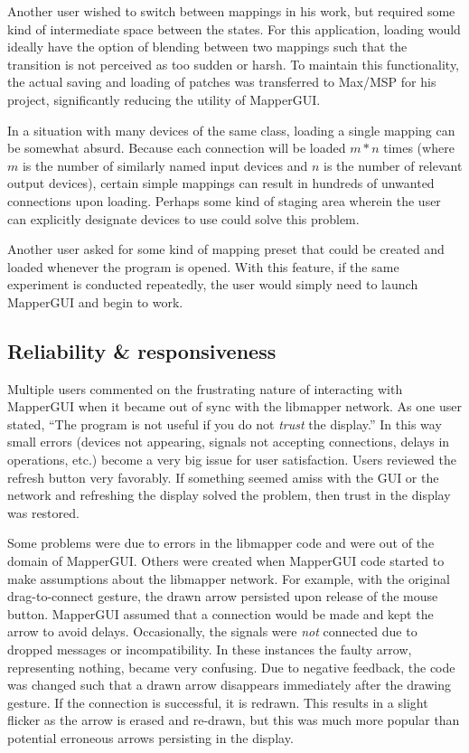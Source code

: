 Another user wished to switch between mappings in his work, but required some kind of intermediate space between the states. For this application, loading would ideally have the option of blending between two mappings such that the transition is not perceived as too sudden or harsh. To maintain this functionality, the actual saving and loading of patches was transferred to Max/MSP for his project, significantly reducing the utility of MapperGUI.

In a situation with many devices of the same class, loading a single mapping can be somewhat absurd. Because each connection will be loaded $m*n$ times (where $m$ is the number of similarly named input devices and $n$ is the number of relevant output devices), certain simple mappings can result in hundreds of unwanted connections upon loading. Perhaps some kind of staging area wherein the user can explicitly designate devices to use could solve this problem.

Another user asked for some kind of mapping preset that could be created and loaded whenever the program is opened. With this feature, if the same experiment is conducted repeatedly, the user would simply need to launch MapperGUI and begin to work.
	

	\subsection{Reliability \& responsiveness} %
	\label{sub:reliability_and_responsiveness}

Multiple users commented on the frustrating nature of interacting with MapperGUI when it became out of sync with the libmapper network. As one user stated, ``The program is not useful if you do not \emph{trust} the display.'' In this way small errors (devices not appearing, signals not accepting connections, delays in operations, etc.) become a very big issue for user satisfaction. Users reviewed the refresh button very favorably. If something seemed amiss with the GUI or the network and refreshing the display solved the problem, then trust in the display was restored.

Some problems were due to errors in the libmapper code and were out of the domain of MapperGUI. Others were created when MapperGUI code started to make assumptions about the libmapper network. For example, with the original drag-to-connect gesture, the drawn arrow persisted upon release of the mouse button. MapperGUI assumed that a connection would be made and kept the arrow to avoid delays. Occasionally, the signals were \emph{not} connected due to dropped messages or incompatibility. In these instances the faulty arrow, representing nothing, became very confusing. Due to negative feedback, the code was changed such that a drawn arrow disappears immediately after the drawing gesture. If the connection is successful, it is redrawn. This results in a slight flicker as the arrow is erased and re-drawn, but this was much more popular than potential erroneous arrows persisting in the display.

